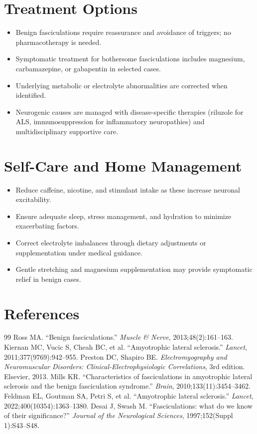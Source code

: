 \section*{Treatment Options}
\begin{itemize}
  \item Benign fasciculations require reassurance and avoidance of triggers; no pharmacotherapy is needed.
  \item Symptomatic treatment for bothersome fasciculations includes magnesium, carbamazepine, or gabapentin in selected cases.
  \item Underlying metabolic or electrolyte abnormalities are corrected when identified.
  \item Neurogenic causes are managed with disease-specific therapies (riluzole for ALS, immunosuppression for inflammatory neuropathies) and multidisciplinary supportive care.
\end{itemize}

\section*{Self-Care and Home Management}
\begin{itemize}
  \item Reduce caffeine, nicotine, and stimulant intake as these increase neuronal excitability.
  \item Ensure adequate sleep, stress management, and hydration to minimize exacerbating factors.
  \item Correct electrolyte imbalances through dietary adjustments or supplementation under medical guidance.
  \item Gentle stretching and magnesium supplementation may provide symptomatic relief in benign cases.
\end{itemize}

\section*{References}
\begin{thebibliography}{99}
 Ross MA. ``Benign fasciculations.'' \textit{Muscle \& Nerve}, 2013;48(2):161--163.
 Kiernan MC, Vucic S, Cheah BC, et al. ``Amyotrophic lateral sclerosis.'' \textit{Lancet}, 2011;377(9769):942--955.
 Preston DC, Shapiro BE. \textit{Electromyography and Neuromuscular Disorders: Clinical-Electrophysiologic Correlations}, 3rd edition. Elsevier, 2013.
 Mills KR. ``Characteristics of fasciculations in amyotrophic lateral sclerosis and the benign fasciculation syndrome.'' \textit{Brain}, 2010;133(11):3454--3462.
 Feldman EL, Goutman SA, Petri S, et al. ``Amyotrophic lateral sclerosis.'' \textit{Lancet}, 2022;400(10354):1363--1380.
 Desai J, Swash M. ``Fasciculations: what do we know of their significance?'' \textit{Journal of the Neurological Sciences}, 1997;152(Suppl 1):S43--S48.

\end{thebibliography}
